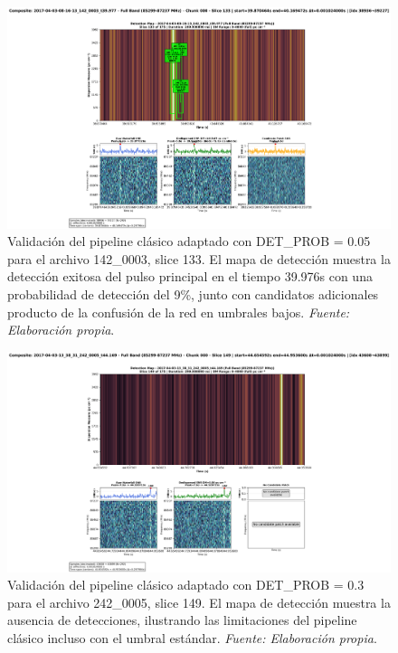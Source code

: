 \begin{figure}[H]
    \centering
    \includegraphics[width=\textwidth]{figures/2017-04-03-08-16-13_142_0003_t39.977_slice133-lowProb.png}
    \caption[ALMA 142\_0003: DET\_PROB 0.05]{Validación del pipeline clásico adaptado con DET\_PROB = 0.05 para el archivo 142\_0003, slice 133. El mapa de detección muestra la detección exitosa del pulso principal en el tiempo 39.976s con una probabilidad de detección del 9\%, junto con candidatos adicionales producto de la confusión de la red en umbrales bajos. \textit{Fuente: Elaboración propia}.}
    \label{fig:142_0003_slice133_lowProb}
\end{figure}

\begin{figure}[H]
    \centering
    \includegraphics[width=\textwidth]{figures/2017-04-03-13_38_31_242_0005_t44.169_slice149.png}
    \caption[ALMA 242\_0005: DET\_PROB 0.3]{Validación del pipeline clásico adaptado con DET\_PROB = 0.3 para el archivo 242\_0005, slice 149. El mapa de detección muestra la ausencia de detecciones, ilustrando las limitaciones del pipeline clásico incluso con el umbral estándar. \textit{Fuente: Elaboración propia}.}
    \label{fig:242_0005_slice149_highProb}
\end{figure}

